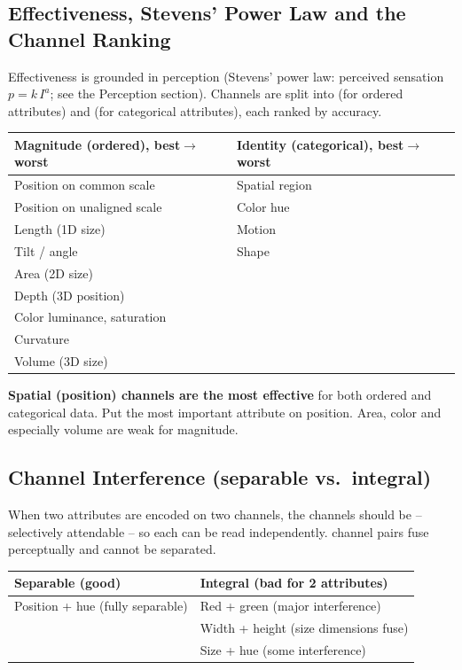 \subsection{Effectiveness, Stevens' Power Law and the Channel Ranking}

Effectiveness is grounded in perception (Stevens' power law: perceived
sensation $p = k\,I^{a}$; see the Perception section). Channels are split into
 (for ordered attributes) and  (for categorical attributes), each ranked by accuracy.

\begin{longtable}{@{}p{6.7cm}p{6.7cm}@{}}
\toprule
\textbf{Magnitude (ordered), best$\to$worst} & \textbf{Identity (categorical), best$\to$worst} \\
\midrule
Position on common scale     & Spatial region \\
Position on unaligned scale  & Color hue \\
Length (1D size)             & Motion \\
Tilt / angle                 & Shape \\
Area (2D size)               & \\
Depth (3D position)          & \\
Color luminance, saturation  & \\
Curvature                    & \\
Volume (3D size)             & \\
\bottomrule
\end{longtable}

\begin{keybox}[Takeaways]
\textbf{Spatial (position) channels are the most effective} for both ordered
and categorical data. Put the most important attribute on position. Area, color
and especially volume are weak for magnitude.
\end{keybox}

\subsection{Channel Interference (separable vs.\ integral)}

When two attributes are encoded on two channels, the channels should be
 -- selectively attendable -- so each can be read independently.
 channel pairs fuse perceptually and cannot be separated.

\begin{longtable}{@{}p{6.5cm}p{6.9cm}@{}}
\toprule
\textbf{Separable (good)} & \textbf{Integral (bad for 2 attributes)} \\
\midrule
Position + hue (fully separable) & Red + green (major interference) \\
                                 & Width + height (size dimensions fuse) \\
                                 & Size + hue (some interference) \\
\bottomrule
\end{longtable}

